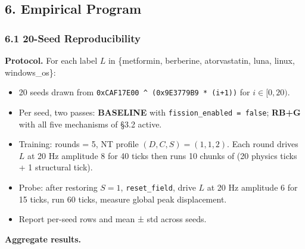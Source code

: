 \documentclass[
  11pt,
  a4paper,
]{article}
\providecommand{\tightlist}{%
  \setlength{\itemsep}{0pt}\setlength{\parskip}{0pt}}
\begin{document}
\subsection{6. Empirical Program}\label{empirical-program}

\subsubsection{6.1 20-Seed Reproducibility}\label{seed-reproducibility}

\textbf{Protocol.} For each label \(L\) in \{metformin, berberine,
atorvastatin, luna, linux, windows\_os\}:

\begin{itemize}
\tightlist
\item
  20 seeds drawn from \texttt{0xCAF17E00\ \^{}\ (0x9E3779B9\ *\ (i+1))}
  for \(i \in [0, 20)\).
\item
  Per seed, two passes: \textbf{BASELINE} with
  \texttt{fission\_enabled\ =\ false}; \textbf{RB+G} with all five
  mechanisms of §3.2 active.
\item
  Training: rounds = 5, NT profile \((D, C, S) = (1, 1, 2)\). Each round
  drives \(L\) at 20 Hz amplitude 8 for 40 ticks then runs 10 chunks of
  (20 physics ticks + 1 structural tick).
\item
  Probe: after restoring \(S = 1\), \texttt{reset\_field}, drive \(L\)
  at 20 Hz amplitude 6 for 15 ticks, run 60 ticks, measure global peak
  displacement.
\item
  Report per-seed rows and mean ± std across seeds.
\end{itemize}

\textbf{Aggregate results.}
\end{document}
